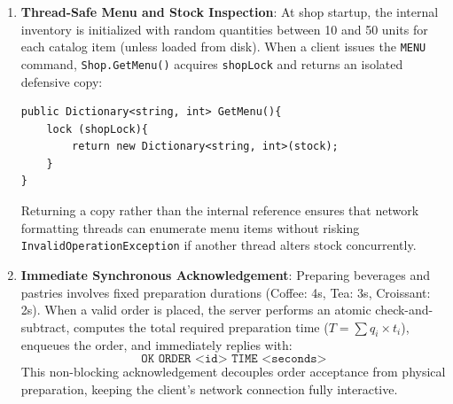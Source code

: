 \documentclass[11pt,a4paper]{article}
\begin{document}
\begin{enumerate}
    \item \textbf{Thread-Safe Menu and Stock Inspection}:
    At shop startup, the internal inventory is initialized with random quantities between 10 and 50 units for each catalog item (unless loaded from disk). When a client issues the \texttt{MENU} command, \texttt{Shop.GetMenu()} acquires \texttt{shopLock} and returns an isolated defensive copy:
    \begin{lstlisting}[language={[Sharp]C}]
public Dictionary<string, int> GetMenu(){
    lock (shopLock){
        return new Dictionary<string, int>(stock);
    }
}
    \end{lstlisting}
    Returning a copy rather than the internal reference ensures that network formatting threads can enumerate menu items without risking \texttt{InvalidOperationException} if another thread alters stock concurrently.

    \item \textbf{Immediate Synchronous Acknowledgement}:
    Preparing beverages and pastries involves fixed preparation durations (Coffee: 4s, Tea: 3s, Croissant: 2s). When a valid order is placed, the server performs an atomic check-and-subtract, computes the total required preparation time ($T = \sum q_i \times t_i$), enqueues the order, and immediately replies with:
    $$\texttt{OK ORDER <id> TIME <seconds>}$$
    This non-blocking acknowledgement decouples order acceptance from physical preparation, keeping the client's network connection fully interactive.
\end{enumerate}
\end{document}
